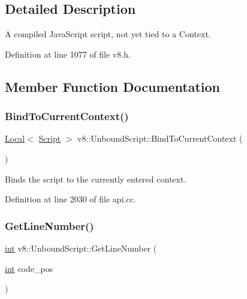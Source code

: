 \subsection{Detailed Description}
A compiled Java\+Script script, not yet tied to a Context. 

Definition at line 1077 of file v8.\+h.



\subsection{Member Function Documentation}
\mbox{\label{classv8_1_1UnboundScript_aeb86867c13854e1baf0756a46958eca0}} 
\subsubsection{\texorpdfstring{Bind\+To\+Current\+Context()}{BindToCurrentContext()}}
{\footnotesize\ttfamily \mbox{\hyperlink{classv8_1_1Local}{Local}}$<$ \mbox{\hyperlink{classv8_1_1Script}{Script}} $>$ v8\+::\+Unbound\+Script\+::\+Bind\+To\+Current\+Context (\begin{DoxyParamCaption}{ }\end{DoxyParamCaption})}

Binds the script to the currently entered context. 

Definition at line 2030 of file api.\+cc.

\mbox{\label{classv8_1_1UnboundScript_a020ca8bbe6ea2313aeedc993ccac3741}} 
\subsubsection{\texorpdfstring{Get\+Line\+Number()}{GetLineNumber()}}
{\footnotesize\ttfamily \mbox{\hyperlink{classint}{int}} v8\+::\+Unbound\+Script\+::\+Get\+Line\+Number (\begin{DoxyParamCaption}\item[{\mbox{\hyperlink{classint}{int}}}]{code\+\_\+pos }\end{DoxyParamCaption})}

